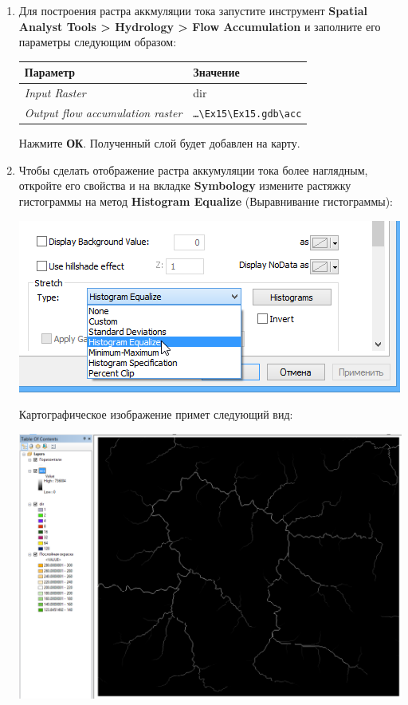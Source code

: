 \documentclass[]{book}
\theoremstyle{definition}
\theoremstyle{definition}
\theoremstyle{definition}
\theoremstyle{remark}
\begin{document}
\begin{enumerate}
\def\labelenumi{\arabic{enumi}.}
\item
  Для построения растра аккмуляции тока запустите инструмент
  \textbf{Spatial Analyst Tools \textgreater{} Hydrology \textgreater{}
  Flow Accumulation} и заполните его параметры следующим образом:

  \begin{longtable}[]{@{}ll@{}}
  \toprule
  Параметр & Значение\tabularnewline
  \midrule
  \endhead
  \emph{Input Raster} & dir\tabularnewline
  \emph{Output flow accumulation raster} &
  \texttt{\ldots{}\textbackslash{}Ex15\textbackslash{}Ex15.gdb\textbackslash{}acc}\tabularnewline
  \bottomrule
  \end{longtable}

  Нажмите \textbf{ОК}. Полученный слой будет добавлен на карту.
\item
  Чтобы сделать отображение растра аккумуляции тока более наглядным,
  откройте его свойства и на вкладке \textbf{Symbology} измените
  растяжку гистограммы на метод \textbf{Histogram Equalize}
  (Выравнивание гистограммы):

  \includegraphics{images/Ex15/image12.png}

  Картографическое изображение примет следующий вид:

  \includegraphics{images/Ex15/image13.png}
\end{enumerate}
\end{document}
